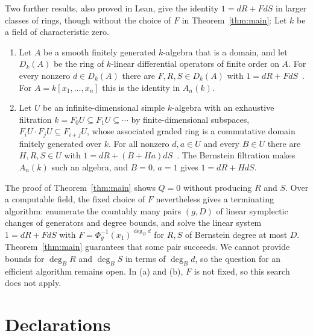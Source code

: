 \documentclass[pdflatex,sn-mathphys-num]{sn-jnl}
\numberwithin{equation}{section}
\theoremstyle{thmstyleone}
\theoremstyle{thmstyletwo}
\begin{document}
Two further results, also proved in Lean, give the identity $1=dR+FdS$ in larger classes of rings, though without the
choice of $F$ in Theorem~\ref{thm:main}: Let $k$ be a field of
characteristic zero.
\begin{enumerate}[label=(\alph*),nosep,leftmargin=1.6em]
\item Let $A$ be a smooth finitely generated $k$-algebra that is a domain,
and let $D_k(A)$ be the ring of $k$-linear differential operators of finite
order on $A$. For every nonzero $d\in D_k(A)$ there are $F,R,S\in D_k(A)$
with $1=dR+FdS$~\cite{GlobalStaffordPalomar2026,GlobalStaffordZenodo106}.
For $A=k[x_1,\dots,x_n]$ this is the identity in $A_n(k)$.
\item Let $U$ be an infinite-dimensional simple $k$-algebra with an
exhaustive filtration $k=F_0U\subseteq F_1U\subseteq\cdots$ by
finite-dimensional subspaces, $F_iU\cdot F_jU\subseteq F_{i+j}U$, whose
associated graded ring is a commutative domain finitely generated over $k$.
For all nonzero $d,a\in U$ and every $B\in U$ there are $H,R,S\in U$ with
$1=dR+(B+Ha)dS$~\cite{SameDivisorFiltered}. The Bernstein filtration makes
$A_n(k)$ such an algebra, and $B=0$, $a=1$ gives $1=dR+HdS$.
\end{enumerate}
The proof of Theorem~\ref{thm:main} shows $Q=0$ without producing $R$ and
$S$. Over a computable field, the fixed choice of $F$ nevertheless gives a terminating algorithm:
enumerate the countably many pairs $(g,D)$ of linear symplectic changes of generators and degree
bounds, and solve the linear system $1=dR+FdS$ with
$F=\Phi_g^{-1}(x_1)^{\deg_Bd}$ for $R,S$ of Bernstein degree at most $D$.
Theorem~\ref{thm:main} guarantees that some pair succeeds. We cannot provide bounds for
$\deg_BR$ and $\deg_BS$ in terms of $\deg_Bd$, so the question for an efficient
algorithm remains open. In (a) and (b), $F$ is not fixed, so this search does
not apply.


\backmatter

\section*{Declarations}
\end{document}
